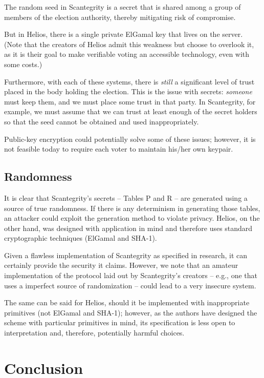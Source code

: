 \documentclass[10pt]{article}
\begin{document}
\begin{multicols}{2}
The random seed in Scantegrity is a secret that is shared among a group of members of the election
authority, thereby mitigating risk of compromise.

But in Helios, there is a single private ElGamal key that lives on the server. (Note that the
creators of Helios admit this weakness but choose to overlook it, as it is their goal to make
verifiable voting an accessible technology, even with some costs.)

Furthermore, with each of these systems, there is \emph{still} a significant level of trust placed
in the body holding the election. This is the issue with secrets: \emph{someone} must keep them, and
we must place some trust in that party. In Scantegrity, for example, we must assume that we can
trust at least enough of the secret holders so that the seed cannot be obtained and used
inappropriately.

Public-key encryption could potentially solve some of these issues; however, it is not feasible
today to require each voter to maintain his/her own keypair.

\subsection{Randomness}

It is clear that Scantegrity's secrets -- Tables P and R -- are generated using a source of true
randomness. If there is any determinism in generating those tables, an attacker could exploit the
generation method to violate privacy. Helios, on the other hand, was designed with application in
mind and therefore uses standard cryptographic techniques (ElGamal and SHA-1).

Given a flawless implementation of Scantegrity as specified in research, it can certainly provide the
security it claims. However, we note that an amateur implementation of the protocol laid out by
Scantegrity's creators -- e.g., one that uses a imperfect source of randomization -- could lead to a
very insecure system.

The same can be said for Helios, should it be implemented with inappropriate primitives (not ElGamal
and SHA-1); however, as the authors have designed the scheme with particular primitives in mind, its
specification is less open to interpretation and, therefore, potentially harmful choices.

\section{Conclusion}


\end{multicols}
\end{document}
